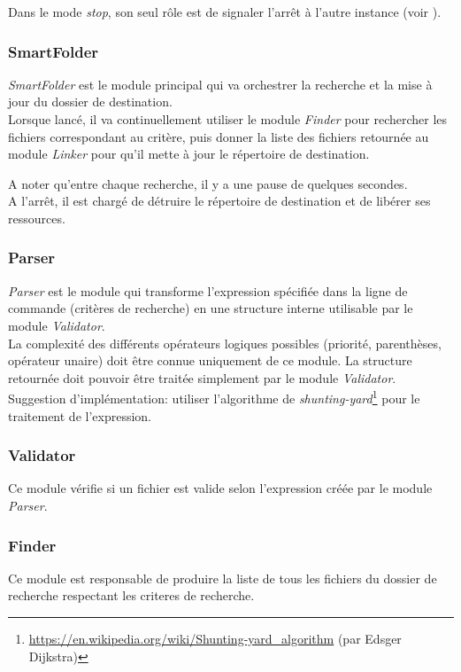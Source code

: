 \documentclass[11pt, a4paper]{article}
\begin{document}
Dans le mode \textit{stop}, son seul rôle est de signaler l'arrêt à l'autre instance (voir ).

\subsubsection{SmartFolder}
\textit{SmartFolder} est le module principal qui va orchestrer la recherche et la mise à jour du dossier de destination. \\

Lorsque lancé, il va continuellement utiliser le module \textit{Finder} pour rechercher les fichiers correspondant au critère,
puis donner la liste des fichiers retournée au module \textit{Linker} pour qu'il mette à jour le répertoire de destination.

A noter qu'entre chaque recherche, il y a une pause de quelques secondes. \\

A l'arrêt, il est chargé de détruire le répertoire de destination et de libérer ses ressources.

\subsubsection{Parser}
\textit{Parser} est le module qui transforme
l'expression spécifiée dans la ligne de commande (critères de recherche) en une structure interne utilisable par le module \textit{Validator}. \\

La complexité des différents opérateurs logiques possibles (priorité, parenthèses, opérateur unaire) doit être connue uniquement de ce module. La structure retournée doit pouvoir être traitée simplement par le module \textit{Validator}. \\

Suggestion d'implémentation: utiliser l'algorithme de \textit{shunting-yard}\footnote{\url{https://en.wikipedia.org/wiki/Shunting-yard\_algorithm} (par Edsger Dijkstra)} pour le traitement de l'expression.

\subsubsection{Validator}
Ce module vérifie si un fichier est valide selon l'expression créée par le module \textit{Parser}.

\subsubsection{Finder}
Ce module est responsable de produire la liste de tous les fichiers du dossier de recherche respectant les criteres de recherche.
\end{document}
